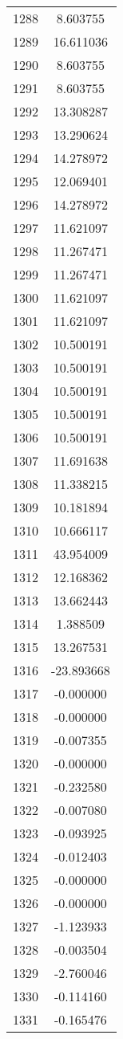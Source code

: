\documentclass[12pt]{article}
\begin{document}
\begin{longtable}{@{}cc@{}}
1288 & 8.603755 \\
1289 & 16.611036 \\
1290 & 8.603755 \\
1291 & 8.603755 \\
1292 & 13.308287 \\
1293 & 13.290624 \\
1294 & 14.278972 \\
1295 & 12.069401 \\
1296 & 14.278972 \\
1297 & 11.621097 \\
1298 & 11.267471 \\
1299 & 11.267471 \\
1300 & 11.621097 \\
1301 & 11.621097 \\
1302 & 10.500191 \\
1303 & 10.500191 \\
1304 & 10.500191 \\
1305 & 10.500191 \\
1306 & 10.500191 \\
1307 & 11.691638 \\
1308 & 11.338215 \\
1309 & 10.181894 \\
1310 & 10.666117 \\
1311 & 43.954009 \\
1312 & 12.168362 \\
1313 & 13.662443 \\
1314 & 1.388509 \\
1315 & 13.267531 \\
1316 & -23.893668 \\
1317 & -0.000000 \\
1318 & -0.000000 \\
1319 & -0.007355 \\
1320 & -0.000000 \\
1321 & -0.232580 \\
1322 & -0.007080 \\
1323 & -0.093925 \\
1324 & -0.012403 \\
1325 & -0.000000 \\
1326 & -0.000000 \\
1327 & -1.123933 \\
1328 & -0.003504 \\
1329 & -2.760046 \\
1330 & -0.114160 \\
1331 & -0.165476 \\

\end{longtable}
\end{document}

